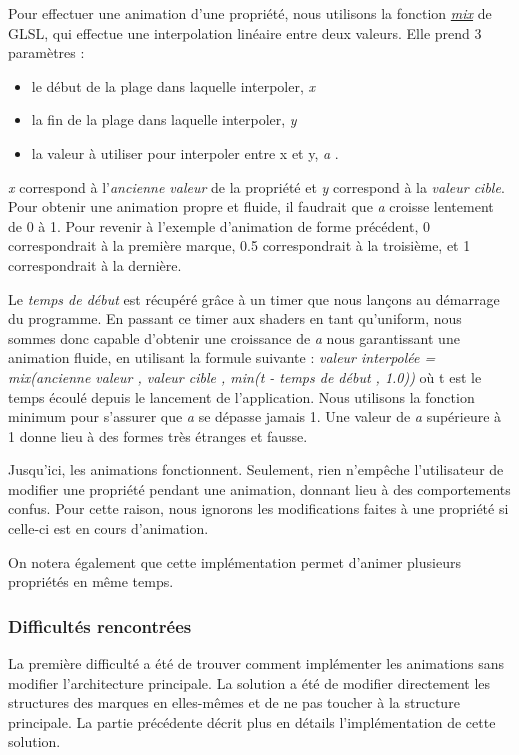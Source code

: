 \documentclass[12pt]{article}
\begin{document}
Pour effectuer une animation d'une propriété, nous utilisons la fonction
\textit{\href{https://www.khronos.org/registry/OpenGL-Refpages/gl4/html/mix.xhtml}{mix}} de GLSL, qui effectue une
interpolation linéaire entre deux valeurs.
Elle prend 3 paramètres :
\begin{itemize}
\item le début de la plage dans laquelle interpoler, \og \textit{x} \fg{}
\item la fin de la plage dans laquelle interpoler, \og \textit{y} \fg{}
\item la valeur à utiliser pour interpoler entre x et y, \og \textit{a} \fg{}.
\end{itemize}

\textit{x} correspond à l'\textit{ancienne valeur} de la propriété et \textit{y} correspond à la
\textit{valeur cible}.
Pour obtenir une animation propre et fluide, il faudrait que \textit{a} croisse lentement de 0 à 1.
Pour revenir à l'exemple d'animation de forme précédent, 0 correspondrait à la première marque, 0.5
correspondrait à la troisième, et 1 correspondrait à la dernière.

Le \textit{temps de début} est récupéré grâce à un timer que nous lançons au démarrage du programme.
En passant ce timer aux shaders en tant qu'\gls{uniform}, nous sommes donc capable d'obtenir une croissance
de \textit{a} nous garantissant une animation fluide, en utilisant la formule suivante :
\textit{valeur interpolée = mix(ancienne valeur , valeur cible , min(t - temps de début , 1.0))} où t est
le temps  écoulé depuis le lancement de l'application.
Nous utilisons la fonction minimum pour s'assurer que \textit{a} se dépasse jamais 1. Une valeur de
\textit{a} supérieure à 1 donne lieu à des formes très étranges et fausse.

Jusqu'ici, les animations fonctionnent. Seulement, rien n'empêche l'utilisateur de modifier une propriété pendant une animation, donnant lieu à des comportements confus.
Pour cette raison, nous ignorons les modifications faites à une propriété si celle-ci est en cours
d'animation.

On notera également que cette implémentation permet d'animer plusieurs propriétés en même temps.

\subsubsection{Difficultés rencontrées}

La première difficulté a été de trouver comment implémenter les animations sans modifier l'architecture
principale. La solution a été de modifier directement les structures des
marques en elles-mêmes et de ne pas toucher à la structure principale. La partie précédente décrit plus en
détails l'implémentation de cette solution.
\end{document}
